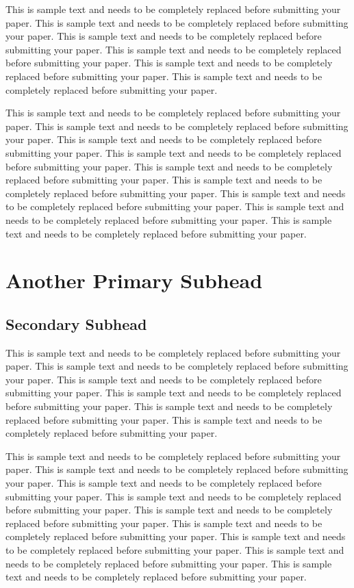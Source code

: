 \documentclass[11pt]{asaproc}
\begin{document}
This is sample text and needs to be completely replaced before submitting your paper. This is sample text and needs to be completely replaced before submitting your paper. This is sample text and needs to be completely replaced before submitting your paper. This is sample text and needs to be completely replaced before submitting your paper. This is sample text and needs to be completely replaced before submitting your paper. This is sample text and needs to be completely replaced before submitting your paper.

This is sample text and needs to be completely replaced before submitting your paper. This is sample text and needs to be completely replaced before submitting your paper. This is sample text and needs to be completely replaced before submitting your paper. This is sample text and needs to be completely replaced before submitting your paper. This is sample text and needs to be completely replaced before submitting your paper. This is sample text and needs to be completely replaced before submitting your paper. This is sample text and needs to be completely replaced before submitting your paper. This is sample text and needs to be completely replaced before submitting your paper. This is sample text and needs to be completely replaced before submitting your paper. 

\section{Another Primary Subhead}

\subsection{Secondary Subhead}


This is sample text and needs to be completely replaced before submitting your paper. This is sample text and needs to be completely replaced before submitting your paper. This is sample text and needs to be completely replaced before submitting your paper. This is sample text and needs to be completely replaced before submitting your paper. This is sample text and needs to be completely replaced before submitting your paper. This is sample text and needs to be completely replaced before submitting your paper.

This is sample text and needs to be completely replaced before submitting your paper. This is sample text and needs to be completely replaced before submitting your paper. This is sample text and needs to be completely replaced before submitting your paper. This is sample text and needs to be completely replaced before submitting your paper. This is sample text and needs to be completely replaced before submitting your paper. This is sample text and needs to be completely replaced before submitting your paper. This is sample text and needs to be completely replaced before submitting your paper. This is sample text and needs to be completely replaced before submitting your paper. This is sample text and needs to be completely replaced before submitting your paper. 
\end{document}

